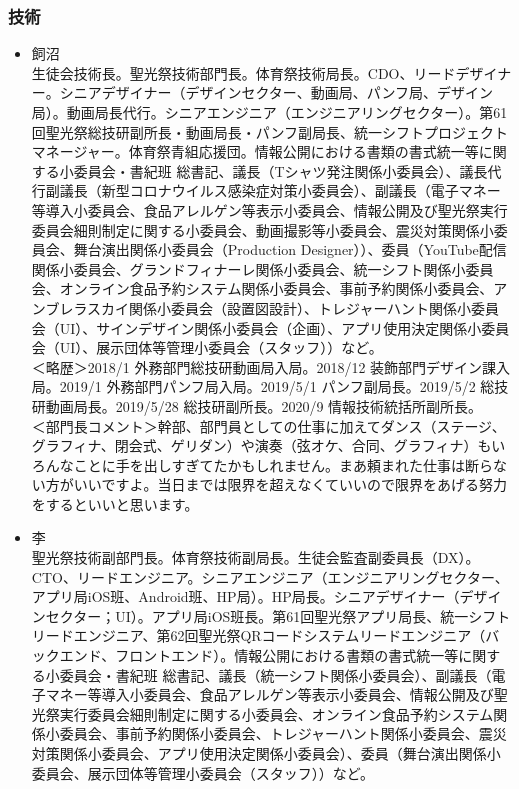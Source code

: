 \documentclass[dvipdfmx,jb5]{jarticle}
\begin{document}
\subsubsection{技術}
\begin{itemize}
  \item 飼沼\\
  生徒会技術長。聖光祭技術部門長。体育祭技術局長。CDO、リードデザイナー。シニアデザイナー（デザインセクター、動画局、パンフ局、デザイン局）。動画局長代行。シニアエンジニア（エンジニアリングセクター）。第61回聖光祭総技研副所長・動画局長・パンフ副局長、統一シフトプロジェクトマネージャー。体育祭青組応援団。情報公開における書類の書式統一等に関する小委員会・書紀班 総書記、議長（Tシャツ発注関係小委員会）、議長代行副議長（新型コロナウイルス感染症対策小委員会）、副議長（電子マネー等導入小委員会、食品アレルゲン等表示小委員会、情報公開及び聖光祭実行委員会細則制定に関する小委員会、動画撮影等小委員会、震災対策関係小委員会、舞台演出関係小委員会（Production Designer））、委員（YouTube配信関係小委員会、グランドフィナーレ関係小委員会、統一シフト関係小委員会、オンライン食品予約システム関係小委員会、事前予約関係小委員会、アンブレラスカイ関係小委員会（設置図設計）、トレジャーハント関係小委員会（UI）、サインデザイン関係小委員会（企画）、アプリ使用決定関係小委員会（UI）、展示団体等管理小委員会（スタッフ））など。\\
  ＜略歴＞2018/1 外務部門総技研動画局入局。2018/12 装飾部門デザイン課入局。2019/1 外務部門パンフ局入局。2019/5/1 パンフ副局長。2019/5/2 総技研動画局長。2019/5/28 総技研副所長。2020/9 情報技術統括所副所長。\\
  ＜部門長コメント＞幹部、部門員としての仕事に加えてダンス（ステージ、グラフィナ、閉会式、ゲリダン）や演奏（弦オケ、合同、グラフィナ）もいろんなことに手を出しすぎてたかもしれません。まあ頼まれた仕事は断らない方がいいですよ。当日までは限界を超えなくていいので限界をあげる努力をするといいと思います。
  \item 李\\
  聖光祭技術副部門長。体育祭技術副局長。生徒会監査副委員長（DX）。CTO、リードエンジニア。シニアエンジニア（エンジニアリングセクター、アプリ局iOS班、Android班、HP局）。HP局長。シニアデザイナー（デザインセクター；UI）。アプリ局iOS班長。第61回聖光祭アプリ局長、統一シフトリードエンジニア、第62回聖光祭QRコードシステムリードエンジニア（バックエンド、フロントエンド）。情報公開における書類の書式統一等に関する小委員会・書紀班 総書記、議長（統一シフト関係小委員会）、副議長（電子マネー等導入小委員会、食品アレルゲン等表示小委員会、情報公開及び聖光祭実行委員会細則制定に関する小委員会、オンライン食品予約システム関係小委員会、事前予約関係小委員会、トレジャーハント関係小委員会、震災対策関係小委員会、アプリ使用決定関係小委員会）、委員（舞台演出関係小委員会、展示団体等管理小委員会（スタッフ））など。\\

\end{itemize}
\end{document}
